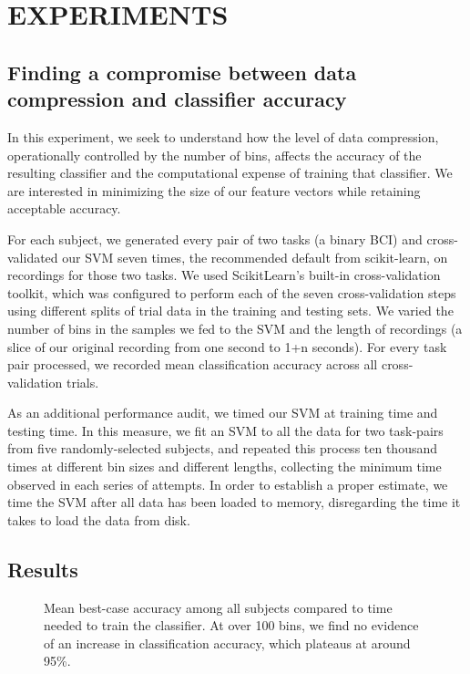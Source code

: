 \section{\uppercase{Experiments}}

\subsection{Finding a compromise between data compression and classifier accuracy}

In this experiment, we seek to understand how the level of data compression, operationally controlled by the number of bins, affects the accuracy of the resulting classifier and the computational expense of training that classifier. We are interested in minimizing the size of our feature vectors while retaining acceptable accuracy.

For each subject, we generated every pair of two tasks (a binary BCI) and cross-validated our SVM seven times, the recommended default from scikit-learn, on recordings for those two tasks. We used ScikitLearn's built-in cross-validation toolkit, which was configured to perform each of the seven cross-validation steps using different splits of trial data in the training and testing sets. We varied the number of bins in the samples we fed to the SVM and the length of recordings (a slice of our original recording from one second to 1+n seconds). For every task pair processed, we recorded mean classification accuracy across all cross-validation trials.

As an additional performance audit, we timed our SVM at training time and testing time. In this measure, we fit an SVM to all the data for two task-pairs from five randomly-selected subjects, and repeated this process ten thousand times at different bin sizes and different lengths, collecting the minimum time observed in each series of attempts. In order to establish a proper estimate, we time the SVM after all data has been loaded to memory, disregarding the time it takes to load the data from disk.

\subsection{Results}

\begin{figure}[!h]
  \vspace{-0.2cm}
  \centering
   {}
  \caption{Mean best-case accuracy among all subjects compared to time needed to train the classifier. At over 100 bins, we find no evidence of an increase in classification accuracy, which plateaus at around 95\%. }
  \label{fig:fig1a}
  \vspace{-0.1cm}
 \end{figure}


